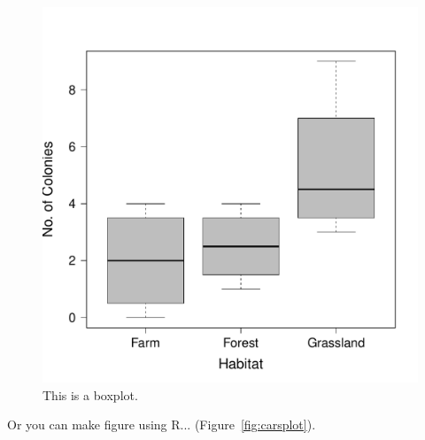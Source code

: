 \documentclass{article}\usepackage[]{graphicx}\usepackage[]{color}
\begin{document}
\begin{figure}
\includegraphics[width=\textwidth]{figure/boxplot-1} %
\caption{This is a boxplot.}
\label{fig:boxplot}
\end{figure}

Or you can make figure using R... (Figure~\ref{fig:carsplot}).
\end{document}
